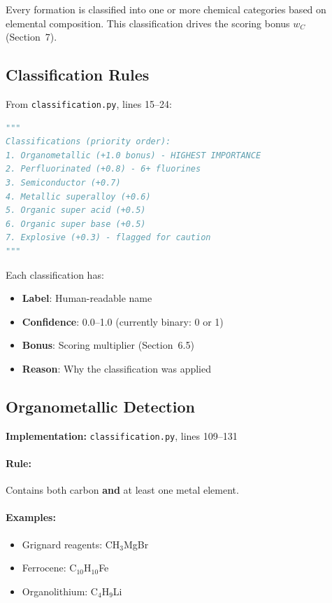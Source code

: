 \documentclass[11pt]{article}
\begin{document}
Every formation is classified into one or more chemical categories based on elemental composition. This classification drives the scoring bonus $w_C$ (Section~7).

\subsection{Classification Rules}

From \texttt{classification.py}, lines 15--24:

\begin{lstlisting}[language=Python]
"""
Classifications (priority order):
1. Organometallic (+1.0 bonus) - HIGHEST IMPORTANCE
2. Perfluorinated (+0.8) - 6+ fluorines
3. Semiconductor (+0.7)
4. Metallic superalloy (+0.6)
5. Organic super acid (+0.5)
6. Organic super base (+0.5)
7. Explosive (+0.3) - flagged for caution
"""
\end{lstlisting}

Each classification has:
\begin{itemize}
\item \textbf{Label}: Human-readable name
\item \textbf{Confidence}: 0.0--1.0 (currently binary: 0 or 1)
\item \textbf{Bonus}: Scoring multiplier (Section~6.5)
\item \textbf{Reason}: Why the classification was applied
\end{itemize}

\subsection{Organometallic Detection}

\textbf{Implementation:} \texttt{classification.py}, lines 109--131

\paragraph{Rule:} Contains both carbon \textbf{and} at least one metal element.

\paragraph{Examples:}
\begin{itemize}
\item Grignard reagents: CH$_3$MgBr
\item Ferrocene: C$_{10}$H$_{10}$Fe
\item Organolithium: C$_4$H$_9$Li
\end{itemize}
\end{document}
